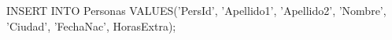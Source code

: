 \lstset{caption=Insértate en la tabla de Personas,label=sql:insertYourself}
\begin{SQL}
INSERT INTO Personas VALUES('PersId', 'Apellido1', 'Apellido2', 'Nombre', 'Ciudad', 'FechaNac', HorasExtra);
\end{SQL}